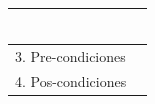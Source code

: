 \documentclass[
11pt, %
codirector, %
]{charter}
\begin{document}
\begin{table}[h!]
\begin{tabularx}{\textwidth}{|ll|X|}
\begin{tabular}[c]{@{}l@{}}
		                                            \end{tabular}                                                                          \\ \hline
		\multicolumn{2}{|l|}{3. Pre-condiciones}  &                                                                                        \\ \hline
		\multicolumn{2}{|l|}{4. Pos-condiciones}  &                                                                                        \\ \hline
	\end{tabularx}
\end{table}
\end{document}
